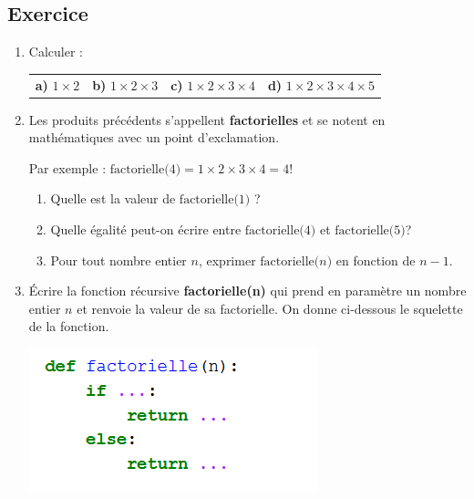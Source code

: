 \documentclass[11pt,a4paper]{article}
\newcounter{numexo}
\begin{document}
\addtocounter{numexo}{1}
\subsection*{\Large Exercice \thenumexo}

\begin{enumerate}
\item Calculer :
\begin{tabular}{*{4}{L{3.5cm}}}
\textbf{a)} $1 \times 2$ &\textbf{b)} $1 \times 2 \times 3$ & \textbf{c)} $1 \times 2 \times 3 \times 4$ & \textbf{d)} $1 \times 2 \times 3 \times 4 \times 5$ \\
\end{tabular}
\item Les produits précédents s'appellent \textbf{factorielles} et se notent en mathématiques avec un point d'exclamation.

Par exemple : $\text{factorielle(4)}=1 \times 2 \times 3 \times 4 = 4!$
\begin{enumerate}
\item Quelle est la valeur de $\text{factorielle(1)}$ ?
\item Quelle égalité peut-on écrire entre $\text{factorielle(4)}$ et $\text{factorielle(5)}$?
\item Pour tout nombre entier $n$, exprimer $\text{factorielle($n$)}$ en fonction de $n-1$.
\end{enumerate}  
\item Écrire la fonction récursive \textbf{factorielle(n)} qui prend en paramètre un nombre entier $n$ et renvoie la valeur de sa factorielle. On donne ci-dessous le squelette de la fonction.
\begin{center}
\includegraphics[scale=0.8]{img/factorielle_vide.png}
\end{center}

\end{enumerate}

\addtocounter{numexo}{1}
\end{document}
